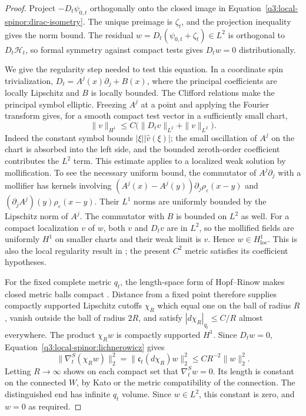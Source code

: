 \begin{proof}
Project $-D_t\psi_{0,t}$ orthogonally onto the closed image in
Equation~\eqref{q3:local-spinor:dirac-isometry}.  The unique preimage is
$\zeta_t$, and the projection inequality gives the norm bound.
The residual
$w=D_t(\psi_{0,t}+\zeta_t)\in L^2$
is orthogonal to $D_t\mathcal H_t$, so formal symmetry against
compact tests gives $D_tw=0$ distributionally.

We give the regularity step needed to test this equation.
In a coordinate spin trivialization,
$D_t=A^j(x)\partial_j+B(x)$, where the principal coefficients
are locally Lipschitz and $B$ is locally bounded.  The Clifford
relations make the principal symbol elliptic.  Freezing $A^j$
at a point and applying the Fourier transform gives, for a
smooth compact test vector in a sufficiently small chart,
\[
 \|v\|_{H^1}\le C\bigl(\|D_tv\|_{L^2}+\|v\|_{L^2}\bigr).
\]
Indeed the constant symbol bounds $|\xi||\widehat v(\xi)|$;
the small oscillation of $A^j$ on the chart is absorbed into
the left side, and the bounded zeroth-order coefficient
contributes the $L^2$ term.  This estimate applies to a localized
weak solution by mollification.  To see the necessary uniform
bound, the commutator of $A^j\partial_j$ with a mollifier has
kernels involving
$(A^j(x)-A^j(y))\partial_j\rho_\varepsilon(x-y)$ and
$(\partial_jA^j)(y)\rho_\varepsilon(x-y)$.
Their $L^1$ norms are uniformly bounded by the Lipschitz norm
of $A^j$.  The commutator with $B$ is bounded on $L^2$ as well.
For a compact localization $v$ of $w$, both $v$ and $D_tv$
are in $L^2$, so the mollified fields are uniformly $H^1$ on
smaller charts and their weak limit is $v$.  Hence
$w\in H^1_{\mathrm{loc}}$.  This is also the local regularity
result in \cite[Theorem~3.7]{BartnikChrusciel2005}; the present
$C^2$ metric satisfies its coefficient hypotheses.

For the fixed complete metric $q_t$, the length-space form of
Hopf--Rinow makes closed metric balls compact
\cite[Section 2.5]{BuragoBuragoIvanov2001}.  Distance from a
fixed point therefore supplies compactly supported Lipschitz
cutoffs $\chi_R$ which equal one on the ball of radius $R$,
vanish outside the ball of radius $2R$, and satisfy
$|d\chi_R|_{q_t}\le C/R$ almost everywhere.
The product $\chi_Rw$ is compactly supported $H^1$.  Since
$D_tw=0$, Equation~\eqref{q3:local-spinor:lichnerowicz} gives
\[
 \|\nabla^S_t(\chi_Rw)\|_2^2
       =\|\mathfrak c_t(d\chi_R)w\|_2^2
       \le CR^{-2}\|w\|_2^2.
\]
Letting $R\to\infty$ shows on each compact set that
$\nabla^S_tw=0$.  Its length is constant on the connected
$W$, by Kato or the metric compatibility of the connection.
The distinguished end has infinite $q_t$ volume.  Since
$w\in L^2$, this constant is zero, and $w=0$ as required.
\end{proof}

